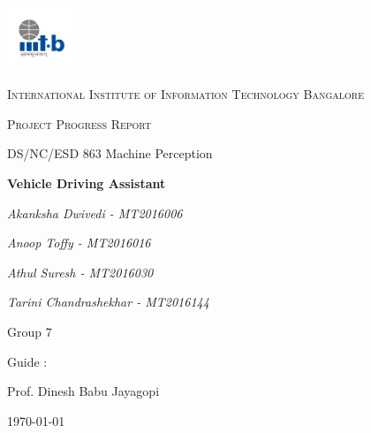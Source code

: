 \documentclass[12pt,a4paper]{article}
\begin{document}
\begin{titlepage}
	\centering
	\includegraphics[width=0.15\textwidth]{IIIT-B_logo.jpg}\par\vspace{1cm}
	{\scshape\LARGE International Institute of Information Technology Bangalore \par}
	\vspace{1cm}
	{\scshape\Large Project Progress Report\par}
	{\Large DS/NC/ESD 863 Machine Perception\par}
	\vspace{1.5cm}
	{\huge\bfseries Vehicle Driving Assistant \par}
	\vspace{2cm}	   
	{\Large\itshape Akanksha Dwivedi - MT2016006\par}
	{\Large\itshape Anoop Toffy - MT2016016\par}
	{\Large\itshape Athul Suresh - MT2016030\par}
	{\Large\itshape Tarini Chandrashekhar - MT2016144\par}
	\vfill
	{\huge Group 7 \par}
	\vfill
	Guide : \par
	Prof. Dinesh Babu Jayagopi 

	\vfill

	{\large \today\par}
\end{titlepage}


\tableofcontents
\newpage
\end{document}
